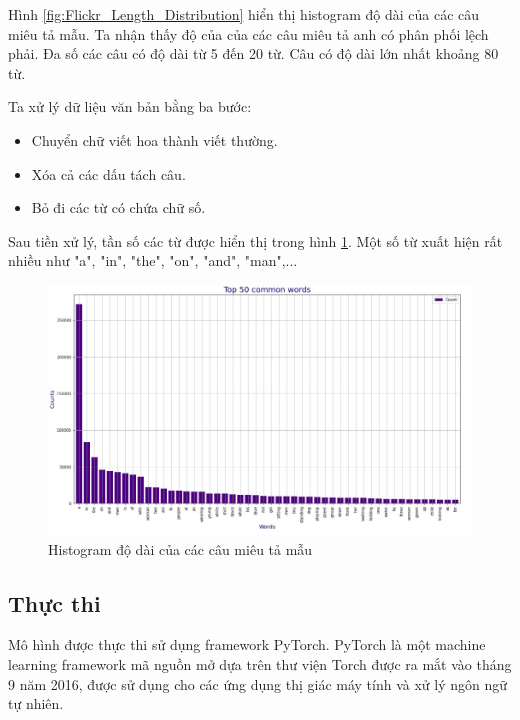 \documentclass[14pt, a4paper]{article}
\numberwithin{equation}{section}
\numberwithin{algorithm}{section}
\numberwithin{figure}{section}
\numberwithin{table}{section}
\numberwithin{dl}{section}
\numberwithin{md}{section}
\numberwithin{bd}{section}
\numberwithin{dn}{section}
\numberwithin{hq}{section}
\begin{document}
    Hình \ref{fig:Flickr_Length_Distribution} hiển thị histogram độ dài của các câu miêu tả mẫu.
    Ta nhận thấy độ của của các câu miêu tả anh có phân phối lệch phải. Đa số các câu có độ dài từ 5 đến 20 từ.
    Câu có độ dài lớn nhất khoảng 80 từ.

    Ta xử lý dữ liệu văn bản bằng ba bước:

    \begin{itemize}
        \item Chuyển chữ viết hoa thành viết thường.
        \item Xóa cả các dấu tách câu.
        \item Bỏ đi các từ có chứa chữ số.
    \end{itemize}

    Sau tiền xử lý, tần số các từ được hiển thị trong hình \ref{fig:Flickr_frequency_processed_word}. Một số từ xuất hiện rất nhiều như "a", "in", "the", "on", "and", "man",...

    \begin{figure}[h!] \centering

        \includegraphics[scale=0.5]{Flickr_frequency_processed_word.jpg}
        \caption{Histogram độ dài của các câu miêu tả mẫu}
        \label{fig:Flickr_frequency_processed_word}

    \end{figure}

    \subsection{Thực thi}

    Mô hình được thực thi sử dụng framework PyTorch. 
    PyTorch là một machine learning framework mã nguồn mở dựa trên thư viện Torch được ra mắt vào tháng 9 năm 2016, được sử dụng cho các ứng dụng thị giác máy tính và xử lý ngôn ngữ tự nhiên.
\end{document}
